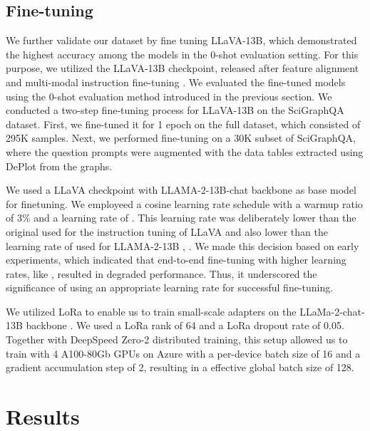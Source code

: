 \documentclass{article}
\begin{document}
\subsection{Fine-tuning}\label{finetuningmethod}
We further validate our dataset by fine tuning LLaVA-13B, which demonstrated the highest accuracy among the models in the 0-shot evaluation setting. For this purpose, we utilized the LLaVA-13B checkpoint, released after feature alignment and multi-modal instruction fine-tuning \cite{liu2023}. We evaluated the fine-tuned models using the 0-shot evaluation method introduced in the previous section.
We conducted a two-step fine-tuning process for LLaVA-13B on the SciGraphQA dataset. First, we fine-tuned it for 1 epoch on the full dataset, which consisted of 295K samples. Next, we performed fine-tuning on a 30K subset of SciGraphQA, where the question prompts were augmented with the data tables extracted using DePlot from the graphs.

We used a LLaVA checkpoint with LLAMA-2-13B-chat backbone as base model for finetuning. We employeed a cosine learning rate schedule with a warmup ratio of 3\% and a learning rate of . This learning rate was deliberately lower than the original  used for the instruction tuning of LLaVA and also lower than the learning rate of  used for LLAMA-2-13B \cite{liu2023}, \cite{touvron2023}. We made this decision based on early experiments, which indicated that end-to-end fine-tuning with higher learning rates, like , resulted in degraded performance. Thus, it underscored the significance of using an appropriate learning rate for successful fine-tuning.

We utilized LoRa to enable us to train small-scale adapters on the LLaMa-2-chat-13B backbone \cite{touvron2023}. We used a LoRa rank of 64 and a LoRa dropout rate of 0.05. Together with DeepSpeed Zero-2 distributed training, this setup allowed us to train with 4 A100-80Gb GPUs on Azure with a per-device batch size of 16 and a gradient accumulation step of 2, resulting in a effective global batch size of 128. 

\section{Results}
\end{document}
